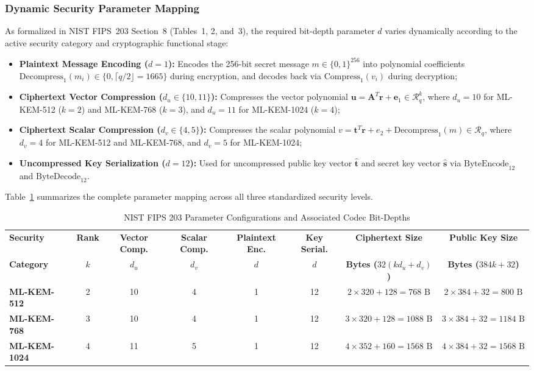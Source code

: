 \subsubsection{Dynamic Security Parameter Mapping}
As formalized in NIST FIPS~203 Section~8 (Tables~1, 2, and~3), the required bit-depth parameter $d$ varies dynamically according to the active security category and cryptographic functional stage:
\begin{itemize}
    \item \textbf{Plaintext Message Encoding ($d = 1$):} Encodes the 256-bit secret message $m \in \{0, 1\}^{256}$ into polynomial coefficients $\text{Decompress}_1(m_i) \in \{0, \lceil q/2 \rfloor = 1665\}$ during encryption, and decodes back via $\text{Compress}_1(v_i)$ during decryption;
    \item \textbf{Ciphertext Vector Compression ($d_u \in \{10, 11\}$):} Compresses the vector polynomial $\mathbf{u} = \mathbf{A}^T \mathbf{r} + \mathbf{e}_1 \in \mathcal{R}_q^k$, where $d_u = 10$ for \mbox{ML-KEM-512} ($k=2$) and \mbox{ML-KEM-768} ($k=3$), and $d_u = 11$ for \mbox{ML-KEM-1024} ($k=4$);
    \item \textbf{Ciphertext Scalar Compression ($d_v \in \{4, 5\}$):} Compresses the scalar polynomial $v = \mathbf{t}^T \mathbf{r} + e_2 + \text{Decompress}_1(m) \in \mathcal{R}_q$, where $d_v = 4$ for \mbox{ML-KEM-512} and \mbox{ML-KEM-768}, and $d_v = 5$ for \mbox{ML-KEM-1024};
    \item \textbf{Uncompressed Key Serialization ($d = 12$):} Used for uncompressed public key vector $\hat{\mathbf{t}}$ and secret key vector $\hat{\mathbf{s}}$ via $\text{ByteEncode}_{12}$ and $\text{ByteDecode}_{12}$.
\end{itemize}
Table~\ref{tab:codec_fips_params} summarizes the complete parameter mapping across all three standardized security levels.

\begin{table}[t]
\caption{NIST FIPS 203 Parameter Configurations and Associated Codec Bit-Depths}
\label{tab:codec_fips_params}
\centering
\footnotesize
\setlength{\tabcolsep}{4.5pt}
\begin{tabular*}{\textwidth}{@{\extracolsep{\fill}} lccccccc @{}}
\toprule
\textbf{Security} & \textbf{Rank} & \textbf{Vector Comp.} & \textbf{Scalar Comp.} & \textbf{Plaintext Enc.} & \textbf{Key Serial.} & \textbf{Ciphertext Size} & \textbf{Public Key Size} \\
\textbf{Category} & $k$ & $d_u$ & $d_v$ & $d$ & $d$ & \textbf{Bytes ($32(k d_u + d_v)$)} & \textbf{Bytes ($384k + 32$)} \\
\midrule
\textbf{ML-KEM-512}  & 2 & 10 & 4 & 1 & 12 & $2 \times 320 + 128 = 768\text{ B}$  & $2 \times 384 + 32 = 800\text{ B}$  \\
\textbf{ML-KEM-768}  & 3 & 10 & 4 & 1 & 12 & $3 \times 320 + 128 = 1088\text{ B}$ & $3 \times 384 + 32 = 1184\text{ B}$ \\
\textbf{ML-KEM-1024} & 4 & 11 & 5 & 1 & 12 & $4 \times 352 + 160 = 1568\text{ B}$ & $4 \times 384 + 32 = 1568\text{ B}$ \\
\bottomrule
\end{tabular*}
\end{table}

